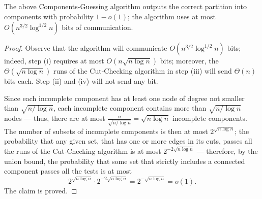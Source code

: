 \begin{thm}
The above Components-Guessing algorithm outputs the correct partition into components with probability $1-o(1)$; the algorithm uses at most $O(n^{3/2} \log^{1/2} n)$ bits of communication.
\end{thm}
\begin{proof}
Observe that the algorithm will communicate $O(n^{3/2} \log^{1/2} n)$ bits; indeed, step (i) requires at most $O(n \sqrt{n \log n})$ bits; moreover, the $\Theta\left(\sqrt{n \log n}\right)$ runs of the Cut-Checking algorithm in step (iii) will send $\Theta(n )$ bits each. Step (ii) and (iv) will not send any bit.


Since each incomplete component has at least one node of degree not smaller than $\sqrt{n / \log n}$, each incomplete component contains more than $\sqrt{n / \log n}$ nodes --- thus, there are at most $\frac n{\sqrt {n / \log n}} = \sqrt{n \log n}$ incomplete components. The number of subsets of incomplete components is then at most $2^{\sqrt{n \log n}}$; the probability that any given set, that has one or more edges in its cuts, passes all the runs of the Cut-Checking algorithm is at most $2^{-2\sqrt{n \log n}}$ --- therefore, by the union bound, the probability that some set that strictly includes a connected component passes all the tests is at most $$2^{\sqrt{n \log n}} \cdot 2^{-2\sqrt{n \log n}} = 2^{-\sqrt{n \log n}} = o(1).$$ The claim is proved.
\end{proof}
